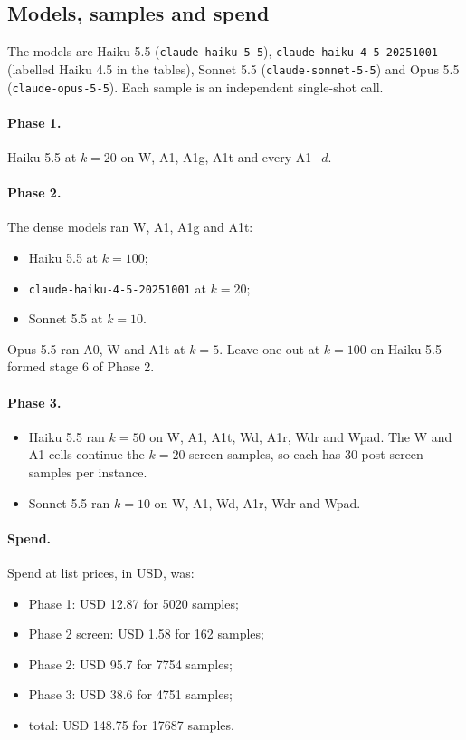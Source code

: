 \subsection{Models, samples and spend}

The models are Haiku 5.5 (\texttt{claude-haiku-5-5}), \texttt{claude-haiku-4-5-20251001} (labelled Haiku 4.5 in the tables), Sonnet 5.5 (\texttt{claude-sonnet-5-5}) and Opus 5.5 (\texttt{claude-opus-5-5}). Each sample is an independent single-shot call.

\paragraph{Phase 1.} Haiku 5.5 at $k=20$ on W, A1, A1g, A1t and every A1$-d$.

\paragraph{Phase 2.} The dense models ran W, A1, A1g and A1t:
\begin{itemize}
\item Haiku 5.5 at $k=100$;
\item \texttt{claude-haiku-4-5-20251001} at $k=20$;
\item Sonnet 5.5 at $k=10$.
\end{itemize}
Opus 5.5 ran A0, W and A1t at $k=5$. Leave-one-out at $k=100$ on Haiku 5.5 formed stage 6 of Phase 2.

\paragraph{Phase 3.}
\begin{itemize}
\item Haiku 5.5 ran $k=50$ on W, A1, A1t, Wd, A1r, Wdr and Wpad. The W and A1 cells continue the $k=20$ screen samples, so each has 30 post-screen samples per instance.
\item Sonnet 5.5 ran $k=10$ on W, A1, Wd, A1r, Wdr and Wpad.
\end{itemize}

\paragraph{Spend.} Spend at list prices, in USD, was:
\begin{itemize}
\item Phase 1: USD 12.87 for 5020 samples;
\item Phase 2 screen: USD 1.58 for 162 samples;
\item Phase 2: USD 95.7 for 7754 samples;
\item Phase 3: USD 38.6 for 4751 samples;
\item total: USD 148.75 for 17687 samples.
\end{itemize}

